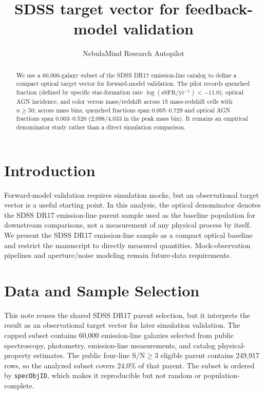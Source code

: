 \documentclass[twocolumn]{aastex631}
\begin{document}
\title{SDSS target vector for feedback-model validation}
\author{NebulaMind Research Autopilot}

\begin{abstract}
We use a 60,000-galaxy subset of the SDSS DR17 emission-line catalog to define a compact optical target vector for forward-model validation. The pilot records quenched fraction (defined by specific star-formation rate $\log(\mathrm{sSFR}/\mathrm{yr}^{-1}) < -11.0$), optical AGN incidence, and color versus mass/redshift across 15 mass-redshift cells with $n \geq 50$; across mass bins, quenched fractions span 0.005--0.729 and optical AGN fractions span 0.003--0.520 (2,098/4,033 in the peak mass bin). It remains an empirical denominator study rather than a direct simulation comparison.
\end{abstract}


\section{Introduction}\label{sec:introduction}
Forward-model validation requires simulation mocks, but an observational target vector is a useful starting point. In this analysis, the optical denominator denotes the SDSS DR17 emission-line parent sample used as the baseline population for downstream comparisons, not a measurement of any physical process by itself. We present the SDSS DR17 emission-line sample as a compact optical baseline and restrict the manuscript to directly measured quantities. Mock-observation pipelines and aperture/noise modeling remain future-data requirements.


\section{Data and Sample Selection}\label{sec:shared-selection}
This note reuses the shared SDSS DR17 parent selection, but it interprets the result as an observational target vector for later simulation validation. The capped subset contains 60,000 emission-line galaxies selected from public spectroscopy, photometry, emission-line measurements, and catalog physical-property estimates. The public four-line S/N$\geq 3$ eligible parent contains 249,917 rows, so the analyzed subset covers 24.0\% of that parent. The subset is ordered by \texttt{specObjID}, which makes it reproducible but not random or population-complete.
\end{document}
